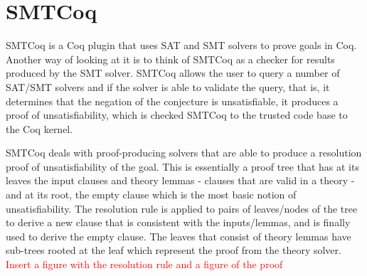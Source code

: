 \documentclass{article}
\begin{document}
\section{SMTCoq}
\label{sec:cert}
	SMTCoq is a Coq plugin that uses SAT and SMT solvers to 
	prove goals in Coq. Another way of looking at it is 
	to think of SMTCoq as a checker for results produced 
	by the SMT solver. SMTCoq allows the user to query 
	a number of SAT/SMT solvers and if the solver is able 
	to validate the query, that is, it determines that 
	the negation of the conjecture is unsatisfiable, it 
	produces a proof of unsatisfiability, which is checked 
	SMTCoq to the trusted code base to the Coq kernel.
	
	SMTCoq deals with proof-producing solvers that are 
	able to produce a resolution proof of unsatisfiability 
	of the goal. This is essentially a proof tree that 
	has at its leaves the input clauses and 
	theory lemmas - clauses that are valid in a 
	theory - and at its root, the empty clause which is 
	the most basic notion of unsatisfiability. The 
	resolution rule is applied to pairs of leaves/nodes 
	of the tree to derive a new clause that is 
	consistent with the inputs/lemmas, and is finally 
	used to derive the empty clause. The leaves 
	that consist of theory lemmas have sub-trees rooted 
	at the leaf which represent the proof from the 
	theory solver.
	\textcolor{red}{Insert a figure with the resolution 
	rule and a figure of the proof}
	
\end{document}
